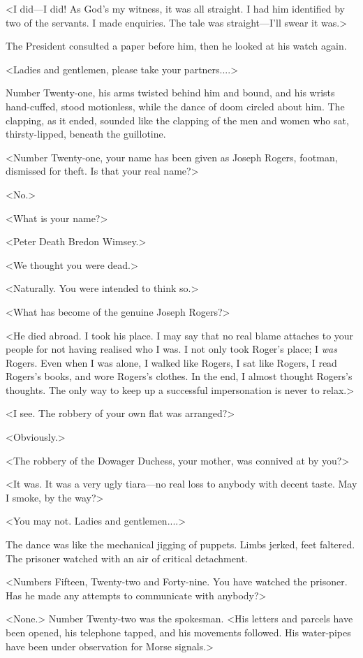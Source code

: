 <I did—I did! As God's my witness, it was all straight. I had him identified by two of the servants. I made enquiries. The tale was straight—I'll swear it was.>

The President consulted a paper before him, then he looked at his watch again.

<Ladies and gentlemen, please take your partners....>

Number Twenty-one, his arms twisted behind him and bound, and his wrists hand-cuffed, stood motionless, while the dance of doom circled about him. The clapping, as it ended, sounded like the clapping of the men and women who sat, thirsty-lipped, beneath the guillotine.

<Number Twenty-one, your name has been given as Joseph Rogers, footman, dismissed for theft. Is that your real name?>

<No.>

<What is your name?>

<Peter Death Bredon Wimsey.>

<We thought you were dead.>

<Naturally. You were intended to think so.>

<What has become of the genuine Joseph Rogers?>

<He died abroad. I took his place. I may say that no real blame attaches to your people for not having realised who I was. I not only took Roger's place; I \emph{was} Rogers. Even when I was alone, I walked like Rogers, I sat like Rogers, I read Rogers's books, and wore Rogers's clothes. In the end, I almost thought Rogers's thoughts. The only way to keep up a successful impersonation is never to relax.>

<I see. The robbery of your own flat was arranged?>

<Obviously.>

<The robbery of the Dowager Duchess, your mother, was connived at by you?>

<It was. It was a very ugly tiara—no real loss to anybody with decent taste. May I smoke, by the way?>

<You may not. Ladies and gentlemen....>

The dance was like the mechanical jigging of puppets. Limbs jerked, feet faltered. The prisoner watched with an air of critical detachment.

<Numbers Fifteen, Twenty-two and Forty-nine. You have watched the prisoner. Has he made any attempts to communicate with anybody?>

<None.> Number Twenty-two was the spokesman. <His letters and parcels have been opened, his telephone tapped, and his movements followed. His water-pipes have been under observation for Morse signals.>

